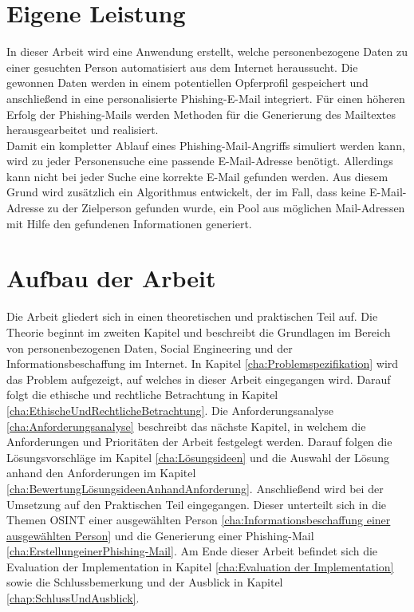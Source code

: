  	
\section{Eigene Leistung}
\label {sec:Eigene Leistung} 
In dieser Arbeit wird eine Anwendung erstellt, welche personenbezogene Daten zu einer gesuchten Person automatisiert aus dem Internet heraussucht. Die gewonnen Daten werden in einem potentiellen Opferprofil gespeichert und anschließend in eine personalisierte Phishing-E-Mail integriert. Für einen höheren Erfolg der Phishing-Mails werden Methoden für die Generierung des Mailtextes herausgearbeitet und realisiert.\\
Damit ein kompletter Ablauf eines Phishing-Mail-Angriffs simuliert werden kann, wird zu jeder Personensuche eine passende E-Mail-Adresse benötigt. Allerdings kann nicht bei jeder Suche eine korrekte E-Mail gefunden werden. Aus diesem Grund wird zusätzlich ein Algorithmus entwickelt, der im Fall, dass keine E-Mail-Adresse zu der Zielperson gefunden wurde, ein Pool aus möglichen Mail-Adressen mit Hilfe den gefundenen Informationen generiert.

\section{Aufbau der Arbeit}
\label {sec:Aufbau der Arbeit} 
Die Arbeit gliedert sich in einen theoretischen und praktischen Teil auf. Die Theorie beginnt im zweiten Kapitel und beschreibt die Grundlagen im Bereich von personenbezogenen Daten, Social Engineering und der Informationsbeschaffung im Internet. In Kapitel \ref{cha:Problemspezifikation} wird das Problem aufgezeigt, auf welches in dieser Arbeit eingegangen wird. Darauf folgt die ethische und rechtliche Betrachtung in Kapitel \ref{cha:EthischeUndRechtlicheBetrachtung}. Die Anforderungsanalyse \ref{cha:Anforderungsanalyse} beschreibt das nächste Kapitel, in welchem die Anforderungen und Prioritäten der Arbeit festgelegt werden. Darauf folgen die Lösungsvorschläge im Kapitel \ref{cha:Lösungsideen} und die Auswahl der Lösung anhand den Anforderungen im Kapitel \ref{cha:BewertungLösungsideenAnhandAnforderung}. Anschließend wird bei der Umsetzung auf den Praktischen Teil eingegangen. Dieser unterteilt sich in die Themen OSINT einer ausgewählten Person \ref{cha:Informationsbeschaffung einer ausgewählten Person} und die Generierung einer Phishing-Mail \ref{cha:ErstellungeinerPhishing-Mail}. Am Ende dieser Arbeit befindet sich die Evaluation der Implementation in Kapitel \ref{cha:Evaluation der Implementation} sowie die Schlussbemerkung und der Ausblick in Kapitel \ref{chap:SchlussUndAusblick}.






